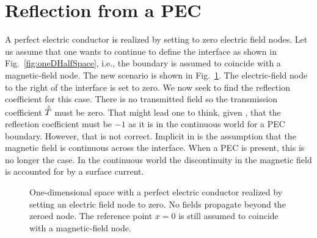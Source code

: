 \section{Reflection from a PEC}

A perfect electric conductor is realized by setting to zero electric
field nodes.  Let us assume that one wants to continue to define the
interface as shown in Fig.\ \ref{fig:oneDHalfSpace}, i.e., the
boundary is assumed to coincide with a magnetic-field node.  The new
scenario is shown in Fig.\ \ref{fig:dielectricPEC}.  The
electric-field node to the right of the interface is set to zero.  We
now seek to find the reflection coefficient for this case.  There is
no transmitted field so the transmission coefficient $\hat{\tilde{T}}$ must be
zero.  That might lead one to think, given ,
that the reflection coefficient must be $-1$ as it is in the
continuous world for a PEC boundary.  However, that is not correct.
Implicit in  is the assumption that the
magnetic field is continuous across the interface.  When a PEC is
present, this is no longer the case.  In the continuous world the
discontinuity in the magnetic field is accounted for by a surface
current.

\begin{figure}
  \begin{center}
  \end{center}
  \caption{One-dimensional space with a perfect electric conductor
  realized by setting an electric field node to zero.  No fields
  propagate beyond the zeroed node.  The reference point $x=0$ is
  still assumed to coincide with a magnetic-field node.}
  \label{fig:dielectricPEC}
\end{figure}


